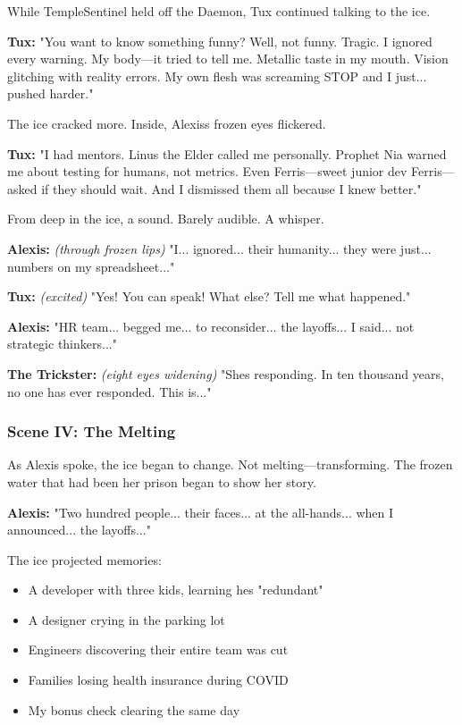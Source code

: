 While TempleSentinel held off the Daemon, Tux continued talking to the ice.

\textbf{Tux:} "You want to know something funny? Well, not funny. Tragic. I ignored every warning. My body---it tried to tell me. Metallic taste in my mouth. Vision glitching with reality errors. My own flesh was screaming \textquotesingle STOP\textquotesingle{} and I just... pushed harder."

The ice cracked more. Inside, Alexis\textquotesingle s frozen eyes flickered.

\textbf{Tux:} "I had mentors. Linus the Elder called me personally. Prophet Nia warned me about testing for humans, not metrics. Even Ferris---sweet junior dev Ferris---asked if they should wait. And I dismissed them all because I knew better."

From deep in the ice, a sound. Barely audible. A whisper.

\textbf{Alexis:} \emph{(through frozen lips)} "I... ignored... their humanity... they were just... numbers on my spreadsheet..."

\textbf{Tux:} \emph{(excited)} "Yes! You can speak! What else? Tell me what happened."

\textbf{Alexis:} "HR team... begged me... to reconsider... the layoffs... I said... \textquotesingle not strategic thinkers\textquotesingle..."

\textbf{The Trickster:} \emph{(eight eyes widening)} "She\textquotesingle s responding. In ten thousand years, no one has ever responded. This is..."

\bookdivider

\subsubsection{Scene IV: The Melting}\label{scene-iv-the-melting}

As Alexis spoke, the ice began to change. Not melting---transforming. The frozen water that had been her prison began to show her story.

\textbf{Alexis:} "Two hundred people... their faces... at the all-hands... when I announced... the layoffs..."

The ice projected memories:

\begin{itemize}
\tightlist
\item
  A developer with three kids, learning he\textquotesingle s "redundant"
\item
  A designer crying in the parking lot
\item
  Engineers discovering their entire team was cut
\item
  Families losing health insurance during COVID
\item
  My bonus check clearing the same day
\end{itemize}

